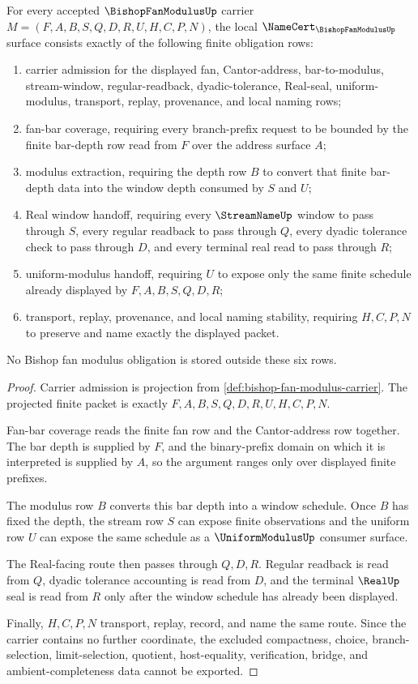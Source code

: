 \begin{theorem}
\label{thm:bishop-fan-modulus-namecert-obligations}
For every accepted $\BishopFanModulusUp$ carrier $M=(F,A,B,S,Q,D,R,U,H,C,P,N)$, the local $\NameCert_{\BishopFanModulusUp}$ surface consists exactly of the following finite obligation rows:
\begin{enumerate}
\item carrier admission for the displayed fan, Cantor-address, bar-to-modulus, stream-window, regular-readback, dyadic-tolerance, Real-seal, uniform-modulus, transport, replay, provenance, and local naming rows;
\item fan-bar coverage, requiring every branch-prefix request to be bounded by the finite bar-depth row read from $F$ over the address surface $A$;
\item modulus extraction, requiring the depth row $B$ to convert that finite bar-depth data into the window depth consumed by $S$ and $U$;
\item Real window handoff, requiring every $\StreamNameUp$ window to pass through $S$, every regular readback to pass through $Q$, every dyadic tolerance check to pass through $D$, and every terminal real read to pass through $R$;
\item uniform-modulus handoff, requiring $U$ to expose only the same finite schedule already displayed by $F,A,B,S,Q,D,R$;
\item transport, replay, provenance, and local naming stability, requiring $H,C,P,N$ to preserve and name exactly the displayed packet.
\end{enumerate}
No Bishop fan modulus obligation is stored outside these six rows.
\end{theorem}
\begin{proof}
Carrier admission is projection from \autoref{def:bishop-fan-modulus-carrier}. The projected finite packet is exactly $F,A,B,S,Q,D,R,U,H,C,P,N$.

Fan-bar coverage reads the finite fan row and the Cantor-address row together. The bar depth is supplied by $F$, and the binary-prefix domain on which it is interpreted is supplied by $A$, so the argument ranges only over displayed finite prefixes.

The modulus row $B$ converts this bar depth into a window schedule. Once $B$ has fixed the depth, the stream row $S$ can expose finite observations and the uniform row $U$ can expose the same schedule as a $\UniformModulusUp$ consumer surface.

The Real-facing route then passes through $Q,D,R$. Regular readback is read from $Q$, dyadic tolerance accounting is read from $D$, and the terminal $\RealUp$ seal is read from $R$ only after the window schedule has already been displayed.

Finally, $H,C,P,N$ transport, replay, record, and name the same route. Since the carrier contains no further coordinate, the excluded compactness, choice, branch-selection, limit-selection, quotient, host-equality, verification, bridge, and ambient-completeness data cannot be exported.
\end{proof}

